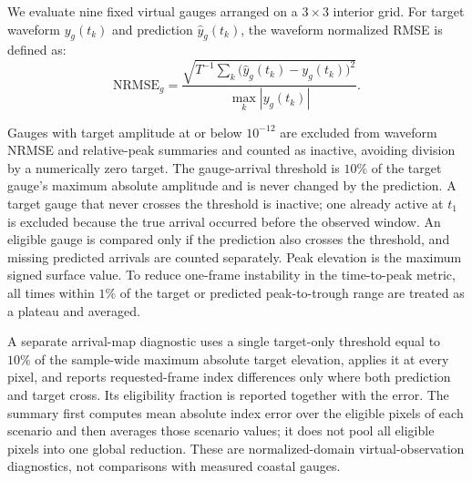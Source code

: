 We evaluate nine fixed virtual gauges arranged on a $3 \times 3$ interior grid. For target waveform $y_g(t_k)$ and prediction $\widehat{y}_g(t_k)$, the waveform normalized RMSE is defined as:
\begin{equation}
\mathrm{NRMSE}_g = \frac{\sqrt{T ^ {-1} \sum_k \bigl(\widehat{y}_g(t_k) - y_g(t_k) \bigr) ^ 2}}{\max_k | y_g(t_k) |}.
\end{equation}

Gauges with target amplitude at or below $10 ^ {-12}$ are excluded from waveform NRMSE and relative-peak summaries and counted as inactive, avoiding division by a numerically zero target. The gauge-arrival threshold is $10\%$ of the target gauge's maximum absolute amplitude and is never changed by the prediction. A target gauge that never crosses the threshold is inactive; one already active at $t_1$ is excluded because the true arrival occurred before the observed window. An eligible gauge is compared only if the prediction also crosses the threshold, and missing predicted arrivals are counted separately. Peak elevation is the maximum signed surface value. To reduce one-frame instability in the time-to-peak metric, all times within $1\%$ of the target or predicted peak-to-trough range are treated as a plateau and averaged.

A separate arrival-map diagnostic uses a single target-only threshold equal to $10\%$ of the sample-wide maximum absolute target elevation, applies it at every pixel, and reports requested-frame index differences only where both prediction and target cross. Its eligibility fraction is reported together with the error. The summary first computes mean absolute index error over the eligible pixels of each scenario and then averages those scenario values; it does not pool all eligible pixels into one global reduction. These are normalized-domain virtual-observation diagnostics, not comparisons with measured coastal gauges.

